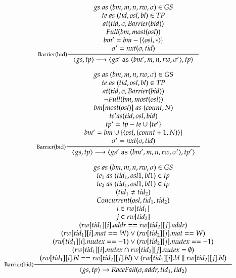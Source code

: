 \begin{framed}
  \[
  \inference[Barrier(bid)]{
    gs\; as\; (bm, m, n, rw, \sigma) \in GS \\
    te\; as\; (tid, osl, bl) \in TP \\
    at(tid, \sigma, Barrier(bid)) \\
    Full(bm, most(osl)) \\
    bm' = bm - \{\langle osl,* \rangle\} \\
    \sigma' = nxt(\sigma, tid)}
  {\langle gs, tp \rangle \longrightarrow
    \langle gs'\; {\rm as}\; \langle bm',m,n,rw,\sigma'\rangle, tp \rangle
  }
  \]

  \[
  \inference[Barrier(bid)]{
    gs\; as\; (bm, m, n, rw, \sigma) \in GS \\
    te\; as\; (tid, osl, bl) \in TP \\
    at(tid, \sigma, Barrier(bid)) \\
    \neg Full(bm, most(osl)) \\
    bm[most(osl)]\; as\; (count, N) \\
    te' as (tid, osl, bid) \\
    tp' = tp - te \cup \{ te' \} \\
    bm' = bm \cup \{\langle osl,(count+1,N) \rangle\} \\
    \sigma' = nxt(\sigma, tid)}
  {\langle gs, tp \rangle \longrightarrow \langle gs'\; {\rm as}\; \langle bm',m,n,rw,\sigma'\rangle, tp' \rangle}
  \]

  \[
  \inference[Barrier(bid)]{
    gs\; as\; (bm, m, n, rw, \sigma) \in GS \\
    te_1\; as\; (tid_1, osl1, bl1) \in tp\\
    te_2\; as\; (tid_1, osl1, bl1) \in tp \\
    (tid_1 \neq tid_2) \\
    Concurrent(osl, tid_1, tid_2) \\
    i \in rw[tid_1] \\
    j \in rw[tid_2] \\
    (rw[tid_1][i].addr == rw[tid_2][j].addr) \\
    (rw[tid_1][i].mat == W) \vee (rw[tid_2][j].mat == W) \\
    (rw[tid_1][i].mutex == -1) \vee (rw[tid_2][j].mutex == -1) \\
    (rw[tid_1][i].nutex \cap rw[tid_2][j].nutex = \emptyset) \\
    (rw[tid_1][i].bl == rw[tid_2][j].bl) \vee (rw[tid_1][i].bl \parallel rw[tid_2][j].bl)}
  {\langle gs, tp \rangle \rightarrow RaceFail(\sigma, addr, tid_1, tid_2)}
  \]
\end{framed}

